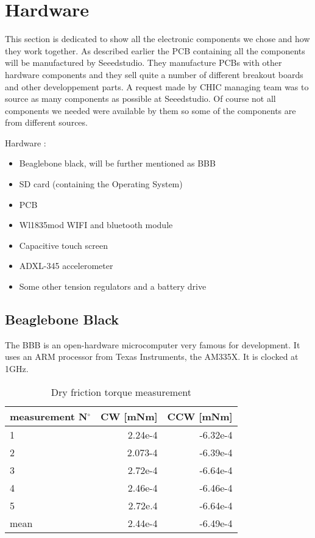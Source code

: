 \section{Hardware}
This section is dedicated to show all the electronic components we chose and how they work together. As described earlier the PCB containing all the components will be manufactured by Seeedstudio. They manufacture PCBs with other hardware components and they sell quite a number of different breakout boards and other developpement parts. A request made by CHIC managing team was to source as many components as possible at Seeedstudio. Of course not all components we needed were available by them so some of the components are from different sources. 

Hardware :
\begin{itemize}
\item{Beaglebone black, will be further mentioned as BBB}
\item{SD card (containing the Operating System)}
\item{PCB}
\item{Wl1835mod WIFI and bluetooth module}
\item{Capacitive touch screen}
\item{ADXL-345 accelerometer}
\item{Some other tension regulators and a battery drive}
\end{itemize}

\subsection{Beaglebone Black}
The BBB is an open-hardware microcomputer very famous for development. It uses an ARM processor from Texas Instruments, the AM335X. It is clocked at 1GHz.
\begin{table}[!htbp]
  \begin{center}
    \begin{tabular}{|l|r|r|}%
      \hline
        measurement N$^{\circ}$ & CW [mNm] & CCW [mNm]\\ \hline %
        1 & 2.24e-4 & -6.32e-4 \\ \hline
        2 & 2.073-4 & -6.39e-4\\ \hline
        3 & 2.72e-4 & -6.64e-4\\ \hline
        4 & 2.46e-4 & -6.46e-4\\ \hline
        5 & 2.72e.4 & -6.64e-4\\ \hline \hline
        mean & 2.44e-4 & -6.49e-4\\ 
         \hline
    \end{tabular}
  \end{center}
  \caption {Dry friction torque measurement} \label{tab:dry friction meas} 
\end{table}
